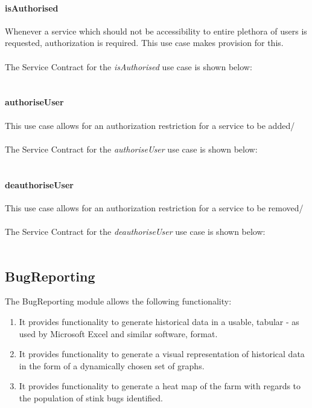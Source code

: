 \documentclass[11pt,a4paper,titlepage]{article}
\begin{document}
		\paragraph{isAuthorised }
		Whenever a service which should not be accessibility to entire plethora of users is requested, authorization is required. This use case makes provision for this.\\\hfill\\
		The Service Contract for the \textit{isAuthorised} use case is shown below:\\\hfill\\
		\paragraph{authoriseUser }
		This use case allows for an authorization restriction for a service to be added/\\\hfill\\
		The Service Contract for the \textit{authoriseUser} use case is shown below:\\\hfill\\
		\paragraph{deauthoriseUser }
				This use case allows for an authorization restriction for a service to be removed/\\\hfill\\
		The Service Contract for the \textit{deauthoriseUser} use case is shown below:\\\hfill\\
		
		
		
	\subsection{BugReporting}
	The BugReporting module allows the following functionality:
	\begin{enumerate}
		\item It provides functionality to generate historical data in a usable, tabular - as used by Microsoft Excel and similar software, format.
		\item It provides functionality to generate a visual representation of historical data in the form of a dynamically chosen set of graphs.
		\item It provides functionality to generate a heat map of the farm with regards to the population of stink bugs identified.
	\end{enumerate}
\end{document}
